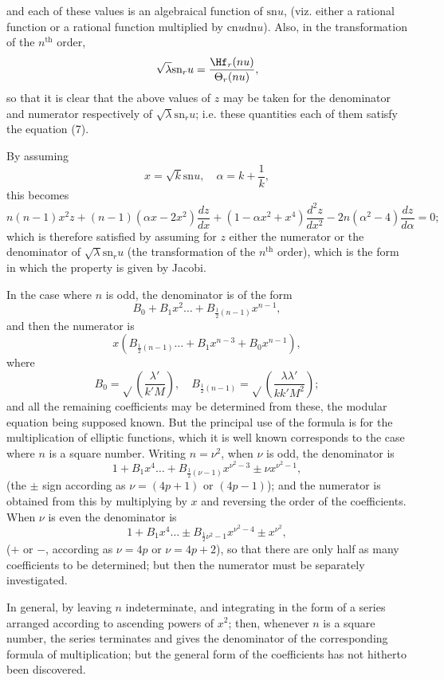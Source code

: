 \documentclass[11pt,a4paper]{book}
\providecommand{\sn}{\mathrm{sn}}
\providecommand{\cn}{\mathrm{cn}}
\providecommand{\dn}{\mathrm{dn}}
\begin{document}
and each of these values is an algebraical function of $\sn u$, (viz. either a rational function or a rational function multiplied by $\cn u \dn u$). Also, in the transformation of the $n^{\text{th}}$ order,
\[
\sqrt{\lambda} \sn_r u = \frac{\Hf_r(nu)}{\Theta_r(nu)},
\]
so that it is clear that the above values of $z$ may be taken for the denominator and numerator respectively of $\sqrt{\lambda} \sn_r u$; i.e. these quantities each of them satisfy the equation (7).

By assuming
\[
x = \sqrt{k} \sn u, \quad \alpha = k + \frac{1}{k},
\]
this becomes
\[
n(n-1)x^2 z + (n-1)(\alpha x - 2x^2)\frac{dz}{dx} + (1 - \alpha x^2 + x^4)\frac{d^2 z}{dx^2} - 2n(\alpha^2 - 4)\frac{dz}{d\alpha} = 0 \tag{8};
\]
which is therefore satisfied by assuming for $z$ either the numerator or the denominator of $\sqrt{\lambda} \sn_r u$ (the transformation of the $n^{\text{th}}$ order), which is the form in which the property is given by Jacobi.

In the case where $n$ is odd, the denominator is of the form
\[
B_0 + B_1 x^2 \ldots + B_{\frac{1}{2}(n-1)} x^{n-1},
\]
and then the numerator is
\[
x (B_{\frac{1}{2}(n-1)} \ldots + B_1 x^{n-3} + B_0 x^{n-1}),
\]
where
\[
B_0 = \sqrt{}\left(\frac{\lambda'}{k' M}\right), \quad B_{\frac{1}{2}(n-1)} = \sqrt{}\left(\frac{\lambda \lambda'}{k k' M^2}\right);
\]
and all the remaining coefficients may be determined from these, the modular equation being supposed known. But the principal use of the formula is for the multiplication of elliptic functions, which it is well known corresponds to the case where $n$ is a square number. Writing $n = \nu^2$, when $\nu$ is odd, the denominator is
\[
1 + B_1 x^4 \ldots + B_{\frac{1}{2}(\nu-1)} x^{\nu^2-3} \pm \nu x^{\nu^2-1},
\]
(the $\pm$ sign according as $\nu = (4p+1)$ or $(4p-1)$); and the numerator is obtained from this by multiplying by $x$ and reversing the order of the coefficients. When $\nu$ is even the denominator is
\[
1 + B_1 x^4 \ldots \pm B_{\frac{1}{2}\nu^2-1} x^{\nu^2-4} \pm x^{\nu^2},
\]
($+$ or $-$, according as $\nu = 4p$ or $\nu = 4p + 2$), so that there are only half as many coefficients to be determined; but then the numerator must be separately investigated.


In general, by leaving $n$ indeterminate, and integrating in the form of a series arranged according to ascending powers of $x^2$; then, whenever $n$ is a square number, the series terminates and gives the denominator of the corresponding formula of multiplication; but the general form of the coefficients has not hitherto been discovered.
\end{document}
